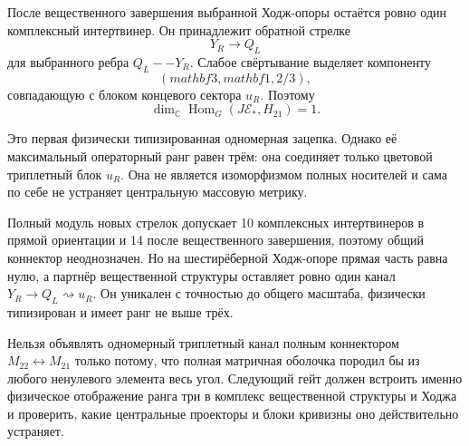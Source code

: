 После вещественного завершения выбранной Ходж-опоры остаётся ровно один комплексный
интертвинер. Он принадлежит обратной стрелке
\begin{equation}
 Y_R\longrightarrow Q_L
\end{equation}
для выбранного ребра $Q_L--Y_R$. Слабое свёртывание выделяет компоненту
\begin{equation}
 (mathbf3,mathbf1,2/3),
\end{equation}
совпадающую с блоком концевого сектора $u_R$. Поэтому
\begin{equation}
 \dim_{\mathbb C}\operatorname{Hom}_G(
 J\mathcal E_* ,H_{21})=1.
 \label{eq:v8-unique-real-selected-intertwiner}
\end{equation}

Это первая физически типизированная одномерная зацепка. Однако её
максимальный операторный ранг равен трём: она соединяет только цветовой
триплетный блок $u_R$. Она не является изоморфизмом полных носителей и сама
по себе не устраняет центральную массовую метрику.

\begin{theorem}
Полный модуль новых стрелок допускает 10 комплексных интертвинеров в прямой
ориентации и 14 после вещественного завершения, поэтому общий коннектор неоднозначен.
Но на шестирёберной Ходж-опоре прямая часть равна нулю, а партнёр вещественной структуры
оставляет ровно один канал $Y_R\to Q_L\rightsquigarrow u_R$. Он уникален с
точностью до общего масштаба, физически типизирован и имеет ранг не выше
трёх.
\end{theorem}

\begin{nogocriterion}
Нельзя объявлять одномерный триплетный канал полным коннектором
$M_{22}\leftrightarrow M_{21}$ только потому, что полная матричная оболочка
породил бы из любого ненулевого элемента весь угол. Следующий гейт должен
встроить именно физическое отображение ранга три в комплекс вещественной структуры и Ходжа и
проверить, какие центральные проекторы и блоки кривизны оно действительно
устраняет.
\end{nogocriterion}


